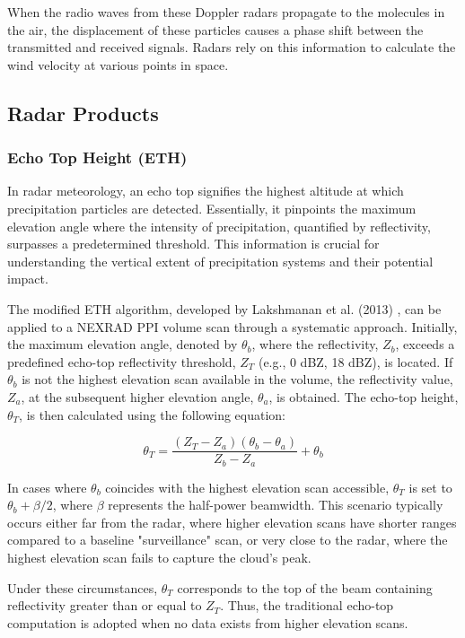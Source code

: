 When the radio waves from these Doppler radars propagate to the molecules in the
air, the displacement of these particles causes a phase shift between the
transmitted and received signals. Radars rely on this information to calculate
the wind velocity at various points in space.

\subsection{Radar Products}



\subsubsection*{Echo Top Height (ETH)}

In radar meteorology, an echo top signifies the highest altitude at which
precipitation particles are detected. Essentially, it pinpoints the maximum
elevation angle where the intensity of precipitation, quantified by
reflectivity, surpasses a predetermined threshold. This information is crucial
for understanding the vertical extent of precipitation systems and their
potential impact.

The modified ETH algorithm, developed by Lakshmanan et al. (2013)
\cite{lakshmanan2013}, can be applied to a NEXRAD PPI volume scan through a
systematic approach. Initially, the maximum elevation angle, denoted by
$\theta_{b}$, where the reflectivity, $Z_{b}$, exceeds a predefined echo-top
reflectivity threshold, $Z_T$ (e.g., 0 dBZ, 18 dBZ), is located. If $\theta_{b}$
is not the highest elevation scan available in the volume, the reflectivity
value, $Z_{a}$, at the subsequent higher elevation angle, $\theta_{a}$, is
obtained. The echo-top height, $\theta_T$, is then calculated using the
following equation:

\[ \theta_T = \frac{(Z_T - Z_a)(\theta_b - \theta_a)}{Z_b - Z_a} + \theta_b \]

In cases where $\theta_{b}$ coincides with the highest elevation scan
accessible, $\theta_{T}$ is set to $\theta_{b} + \beta/2$, where $\beta$
represents the half-power beamwidth. This scenario typically occurs either far
from the radar, where higher elevation scans have shorter ranges compared to a
baseline "surveillance" scan, or very close to the radar, where the highest
elevation scan fails to capture the cloud's peak.

Under these circumstances, $\theta_{T}$ corresponds to the top of the beam
containing reflectivity greater than or equal to $Z_T$. Thus, the traditional
echo-top computation is adopted when no data exists from higher elevation scans.

